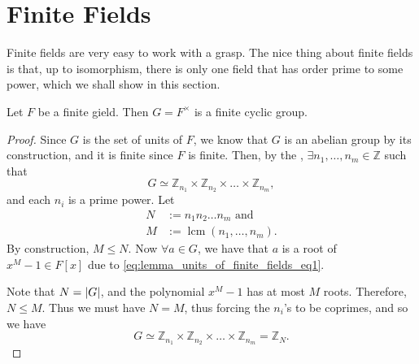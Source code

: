 \documentclass[notoc,notitlepage,nobib]{tufte-book}
\DeclareMathOperator{\lcm}{lcm}
\begin{document}
\section{Finite Fields}%
\label{sec:finite_fields}

Finite fields are very easy to work with a grasp. The nice thing about finite fields is
that, up to isomorphism, there is only one field that has order prime to some power, which
we shall show in this section.

\begin{lemma}\label{lemma:units_of_a_finite_field_form_a_finite_cyclic_group}
  Let $F$ be a finite gield. Then $G = F^\times$ is a finite cyclic group.
\end{lemma}

\begin{proof}
  Since $G$ is the set of units of $F$, we know that $G$ is an abelian group by its
  construction, and it is finite since $F$ is finite. Then, by the , $\exists n_1, \ldots, n_m \in \mathbb{Z}$ such that
  \begin{equation}\label{eq:lemma_units_of_finite_fields_eq1}
    G \simeq \mathbb{Z}_{n_1} \times \mathbb{Z}_{n_2} \times \hdots \times
    \mathbb{Z}_{n_m},
  \end{equation}
  and each $n_i$ is a prime power. Let
  \begin{align*}
    N &:= n_1 n_2 \hdots n_m \text{ and } \\
    M &:= \lcm(n_1, \ldots, n_m).
  \end{align*}
  By construction, $M \leq N$. Now $\forall a \in G$, we have that $a$ is a root of $x^M -
  1 \in F[x]$ due to \cref{eq:lemma_units_of_finite_fields_eq1}.
  
  Note that $N = \left|G\right|$, and the polynomial $x^M - 1$ has at most $M$ roots. Therefore,
  $N \leq M$. Thus we must have $N = M$, thus forcing the $n_i$'s to be coprimes, and so
  we have
  \begin{equation*}
    G \simeq \mathbb{Z}_{n_1} \times \mathbb{Z}_{n_2} \times \hdots \times
    \mathbb{Z}_{n_m} = \mathbb{Z}_N.
  \end{equation*}
\end{proof}
\end{document}

